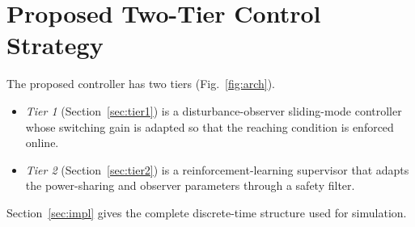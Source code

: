 \section{Proposed Two-Tier Control Strategy}\label{sec:method}
The proposed controller has two tiers (Fig.~\ref{fig:arch}).
\begin{itemize}
\item \emph{Tier 1} (Section~\ref{sec:tier1}) is a disturbance-observer sliding-mode controller whose switching gain is adapted so that the reaching condition is enforced online.
\item \emph{Tier 2} (Section~\ref{sec:tier2}) is a reinforcement-learning supervisor that adapts the power-sharing and observer parameters through a safety filter.
\end{itemize}
Section~\ref{sec:impl} gives the complete discrete-time structure used for simulation.




